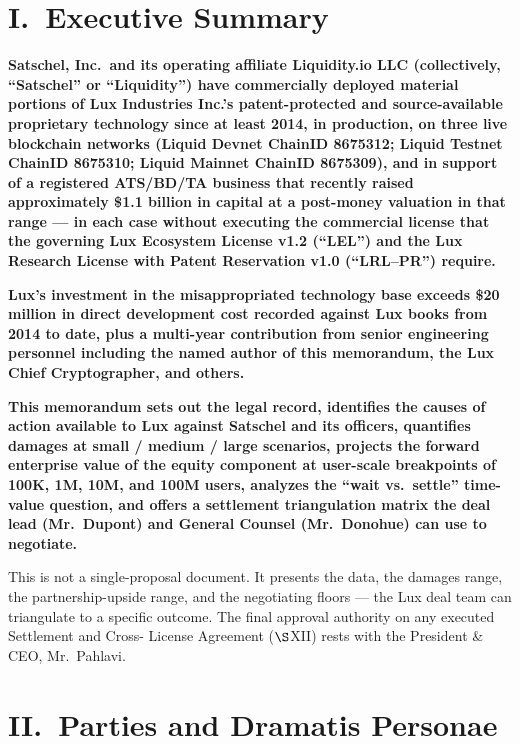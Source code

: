 \documentclass[11pt,letterpaper]{article}
\begin{document}
\section*{I.\ Executive Summary}

\textbf{Satschel, Inc.\ and its operating affiliate Liquidity.io LLC
(collectively, ``Satschel'' or ``Liquidity'') have commercially
deployed material portions of Lux Industries Inc.'s patent-protected
and source-available proprietary technology since at least 2014, in
production, on three live blockchain networks (Liquid Devnet ChainID
8675312; Liquid Testnet ChainID 8675310; Liquid Mainnet ChainID
8675309), and in support of a registered ATS/BD/TA business that
recently raised approximately \$1.1 billion in capital at a post-money
valuation in that range --- in each case without executing the
commercial license that the governing Lux Ecosystem License v1.2
(``LEL'') and the Lux Research License with Patent Reservation v1.0
(``LRL--PR'') require.}

\textbf{Lux's investment in the misappropriated technology base
exceeds \$20 million in direct development cost recorded against Lux
books from 2014 to date, plus a multi-year contribution from senior
engineering personnel including the named author of this memorandum,
the Lux Chief Cryptographer, and others.}

\textbf{This memorandum sets out the legal record, identifies the
causes of action available to Lux against Satschel and its officers,
quantifies damages at small / medium / large scenarios, projects the
forward enterprise value of the equity component at user-scale
breakpoints of 100K, 1M, 10M, and 100M users, analyzes the
``wait vs.\ settle'' time-value question, and offers a settlement
triangulation matrix the deal lead (Mr.\ Dupont) and General Counsel
(Mr.\ Donohue) can use to negotiate.}

This is not a single-proposal document. It presents the data, the
damages range, the partnership-upside range, and the negotiating
floors --- the Lux deal team can triangulate to a specific outcome.
The final approval authority on any executed Settlement and Cross-
License Agreement ($\S$XII) rests with the President \& CEO, Mr.\
Pahlavi.

\section*{II.\ Parties and Dramatis Personae}
\end{document}
